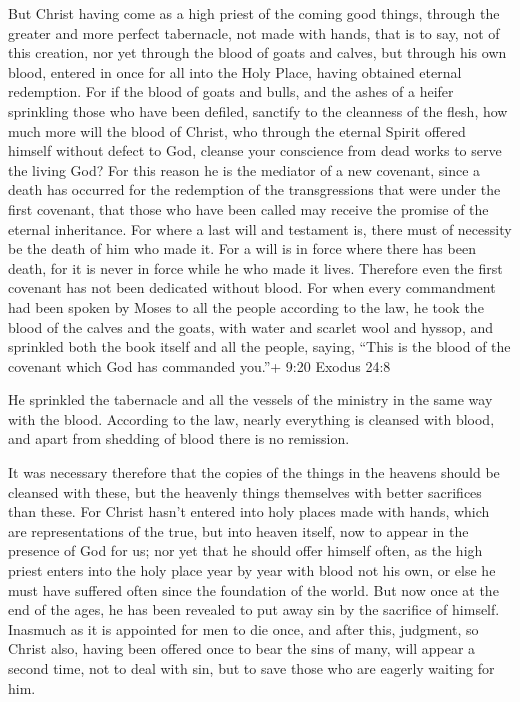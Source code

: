  But Christ having come as a high priest of the coming good
things, through the greater and more perfect tabernacle, not made with
hands, that is to say, not of this creation,  nor yet
through the blood of goats and calves, but through his own blood,
entered in once for all into the Holy Place, having obtained eternal
redemption.  For if the blood of goats and bulls, and the
ashes of a heifer sprinkling those who have been defiled, sanctify to
the cleanness of the flesh,  how much more will the blood
of Christ, who through the eternal Spirit offered himself without defect
to God, cleanse your conscience from dead works to serve the living God?
 For this reason he is the mediator of a new covenant,
since a death has occurred for the redemption of the transgressions that
were under the first covenant, that those who have been called may
receive the promise of the eternal inheritance.  For where
a last will and testament is, there must of necessity be the death of
him who made it.  For a will is in force where there has
been death, for it is never in force while he who made it lives.
 Therefore even the first covenant has not been dedicated
without blood.  For when every commandment had been spoken
by Moses to all the people according to the law, he took the blood of
the calves and the goats, with water and scarlet wool and hyssop, and
sprinkled both the book itself and all the people,  saying,
``This is the blood of the covenant which God has commanded you.''+ 9:20
Exodus 24:8

 He sprinkled the tabernacle and all the vessels of the
ministry in the same way with the blood.  According to the
law, nearly everything is cleansed with blood, and apart from shedding
of blood there is no remission.

 It was necessary therefore that the copies of the things
in the heavens should be cleansed with these, but the heavenly things
themselves with better sacrifices than these.  For Christ
hasn't entered into holy places made with hands, which are
representations of the true, but into heaven itself, now to appear in
the presence of God for us;  nor yet that he should offer
himself often, as the high priest enters into the holy place year by
year with blood not his own,  or else he must have suffered
often since the foundation of the world. But now once at the end of the
ages, he has been revealed to put away sin by the sacrifice of himself.
 Inasmuch as it is appointed for men to die once, and after
this, judgment,  so Christ also, having been offered once
to bear the sins of many, will appear a second time, not to deal with
sin, but to save those who are eagerly waiting for him.

